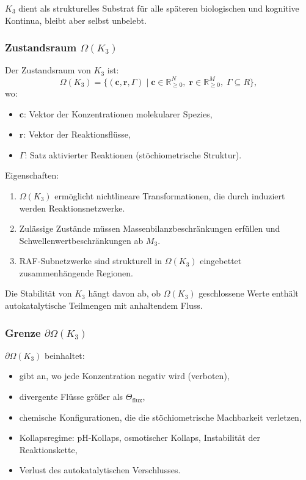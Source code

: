 $K_3$ dient als strukturelles Substrat für alle späteren biologischen und
kognitive Kontinua, bleibt aber selbst unbelebt.

\subsubsection{Zustandsraum \texorpdfstring{$\Omega(K_3)$}{\Omega(K_3)}}

Der Zustandsraum von $K_3$ ist:
\[
\Omega(K_3) = \{ (\mathbf{c}, \mathbf{r}, \Gamma) \mid
\mathbf{c} \in \mathbb{R}_{\ge0}^N,\;
\mathbf{r} \in \mathbb{R}_{\ge0}^M,\;
\Gamma \subseteq R \},
\]
wo:
\begin{itemize}
    \item $\mathbf{c}$: Vektor der Konzentrationen molekularer Spezies,
    \item $\mathbf{r}$: Vektor der Reaktionsflüsse,
    \item $\Gamma$: Satz aktivierter Reaktionen (stöchiometrische Struktur).
\end{itemize}

Eigenschaften:
\begin{enumerate}
    \item $\Omega(K_3)$ ermöglicht nichtlineare Transformationen, die durch induziert werden
          Reaktionsnetzwerke.
    \item Zulässige Zustände müssen Massenbilanzbeschränkungen erfüllen und
          Schwellenwertbeschränkungen ab $M_3$.
    \item RAF-Subnetzwerke sind strukturell in $\Omega(K_3)$ eingebettet
          zusammenhängende Regionen.
\end{enumerate}

Die Stabilität von $K_3$ hängt davon ab, ob $\Omega(K_3)$ geschlossene Werte enthält
autokatalytische Teilmengen mit anhaltendem Fluss.

\subsubsection{Grenze \texorpdfstring{$\partial\Omega(K_3)$}{\partial\Omega(K_3)}}

$\partial\Omega(K_3)$ beinhaltet:
\begin{itemize}
    \item gibt an, wo jede Konzentration negativ wird (verboten),
    \item divergente Flüsse größer als $\Theta_{\mathrm{flux}}$,
    \item chemische Konfigurationen, die die stöchiometrische Machbarkeit verletzen,
    \item Kollapsregime: pH-Kollaps, osmotischer Kollaps,
          Instabilität der Reaktionskette,
    \item Verlust des autokatalytischen Verschlusses.
\end{itemize}

